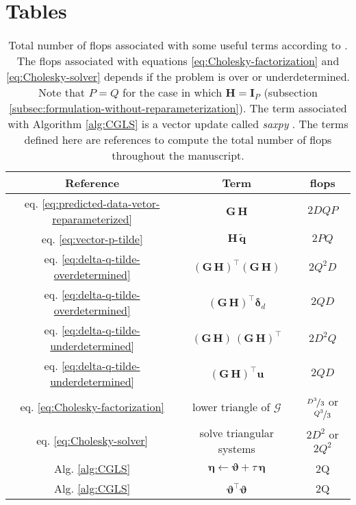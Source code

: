 \section{Tables}

\begin{table}[h!]
	\centering
	\begin{tabular}{c c c}
		Reference & Term & flops \\
		\hline
		eq. \ref{eq:predicted-data-vetor-reparameterized} & $\mathbf{G \, H}$ & $2DQP$ \\
		eq. \ref{eq:vector-p-tilde} & $\mathbf{H} \, \tilde{\mathbf{q}}$ & $2PQ$ \\
		eq. \ref{eq:delta-q-tilde-overdetermined} & $\left(\mathbf{G \, H}\right)^{\top}\left(\mathbf{G \, H}\right)$ & $2Q^{2}D$ \\
		eq. \ref{eq:delta-q-tilde-overdetermined} & $\left(\mathbf{G \, H}\right)^{\top}\boldsymbol{\delta}_{d} $ & $2QD$ \\
		eq. \ref{eq:delta-q-tilde-underdetermined} & $\left(\mathbf{G \, H}\right) \, \left(\mathbf{G \, H}\right)^{\top}$ & $2D^{2}Q$ \\
		eq. \ref{eq:delta-q-tilde-underdetermined} & $\left(\mathbf{G \, H}\right)^{\top}\mathbf{u}$ & $2QD$ \\
		eq. \ref{eq:Cholesky-factorization} & lower triangle of $\boldsymbol{\mathcal{G}}$ & $\nicefrac{D^{3}}{3}$ or $\nicefrac{Q^{3}}{3}$ \\
		eq. \ref{eq:Cholesky-solver} & solve triangular systems & $2D^{2}$ or $2Q^{2}$ \\
		Alg. \ref{alg:CGLS} & $\boldsymbol{\eta} \gets \boldsymbol{\vartheta} + \tau \, \boldsymbol{\eta}$ & 2Q \\
		Alg. \ref{alg:CGLS} & $\boldsymbol{\vartheta}^{\top} \boldsymbol{\vartheta}$ & 2Q \\
	\end{tabular}
	\caption{
		Total number of flops associated with some useful terms according to \citet[][p. 12]{golub-vanloan2013}.
		The flops associated with equations \ref{eq:Cholesky-factorization} and \ref{eq:Cholesky-solver} depends if the
		problem is over or underdetermined.
		Note that $P = Q$ for the case in which $\mathbf{H} = \mathbf{I}_{P}$ (subsection \ref{subsec:formulation-without-reparameterization}).
		The term associated with Algorithm \ref{alg:CGLS} is a vector update called \textit{saxpy} \citep[][p. 4]{golub-vanloan2013}.
		The terms defined here are references to compute the total number of flops throughout the manuscript.
	}
	\label{tab:standard-flops}
\end{table}